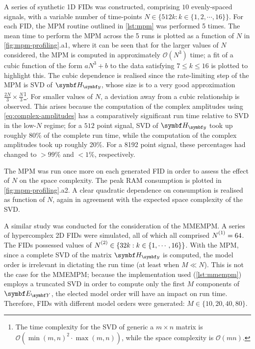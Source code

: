 A series of synthetic \ac{1D} \acp{FID} was constructed, comprising $10$ evenly-spaced
signals, with a
variable number of time-points $N \in \lbrace 512k : k \in \lbrace 1, 2, \cdots, 16 \rbrace \rbrace$.
For each \ac{FID}, the \ac{MPM} routine outlined in \cref{lst:mpm} was
performed 5 times.
The mean time to perform the \ac{MPM} across the 5 runs is plotted as a function
of $N$ in \cref{fig:mpm-profiling}.a1, where it can be seen that for
the larger values of $N$ considered, the \ac{MPM} is computed in approximately
$\mathcal{O}({N}^3)$ time;
a fit of a cubic function of the form $aN^3 + b$ to the data satisfying $7 \leq
k \leq 16$ is plotted to highlight this.
The cubic dependence is realised since the rate-limiting step of the
\ac{MPM} is \ac{SVD} of $\Hy$, whose size is to a very good approximation
$\tfrac{2N}{3} \times \tfrac{N}{3}$\footnote{
    \label{fn:svd-complexity}
    The time complexity for the \ac{SVD} of generic a $m \times n$ matrix is
    $\mathcal{O}(\operatorname{min}(m, n)^2 \cdot \operatorname{max}(m, n))$,
    while the space complexity is $\mathcal{O}(mn)$.
}. For smaller values of $N$, a deviation
away from a cubic relationship is observed.
This arises because the computation of the complex amplitudes using
\cref{eq:complex-amplitudes} has a comparatively significant run time
relative to \ac{SVD} in the low-$N$ regime;
for a $512$ point signal, \ac{SVD} of $\Hy$ took up roughly 80\% of the
complete run time, while the computation of the complex amplitudes took up
roughly 20\%. For a 8192 point signal, these percentages had changed to
$>\!\!99\%$ and $<\!\!1\%$, respectively.

The \ac{MPM} was run once more on each generated \ac{FID} in order to assess
the effect of $N$ on the space complexity.
The peak \ac{RAM} consumption is plotted in \cref{fig:mpm-profiling}.a2.
A clear quadratic dependence on consumption is realised as function of $N$,
again in agreement with the expected space complexity of the
\ac{SVD}.

A similar study was conducted for the consideration of the \ac{MMEMPM}. A
series of hypercomplex \ac{2D} \acp{FID} were simulated, all of which all
comprised $\None = 64$. The \acp{FID} possessed values of $\Ntwo \in \lbrace
32k : k \in \lbrace 1, \cdots, 16 \rbrace \rbrace$.
With the \ac{MPM}, since a complete \ac{SVD} of the matrix $\Hy$ is computed,
the model order is irrelevant in dictating the run time (at least when $M \ll
N$). This is not the case for the \ac{MMEMPM}; because the \Python
implementation used (\cref{lst:mmempm}) employs a truncated \ac{SVD} in order
to compute only the first $M$ components of $\EY$, the elected model order will
have an impact on run time.  Therefore, \acp{FID} with different model orders
were generated: $M \in \lbrace 10, 20, 40, 80 \rbrace$.

